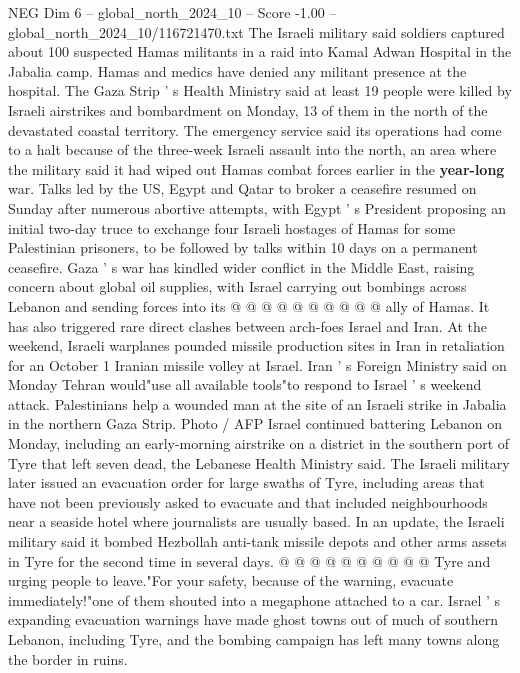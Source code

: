 \begin{textsample}{NEG Dim 6 – global\_north\_2024\_10 – Score -1.00 – global\_north\_2024\_10/116721470.txt}  \label{ex:f6_neg_080}
The Israeli military said soldiers captured about 100 suspected Hamas militants in a raid into Kamal Adwan Hospital in the Jabalia camp.
Hamas and medics have denied any militant presence at the hospital.
The Gaza Strip ' s Health Ministry said at least 19 people were killed by Israeli airstrikes and bombardment on Monday, 13 of them in the north of the devastated coastal territory.
The emergency service said its operations had come to a halt because of the three-week Israeli assault into the north, an area where the military said it had wiped out Hamas combat forces earlier in the \textbf{year-long} war.
Talks led by the US, Egypt and Qatar to broker a ceasefire resumed on Sunday after numerous abortive attempts, with Egypt ' s President proposing an initial two-day truce to exchange four Israeli hostages of Hamas for some Palestinian prisoners, to be followed by talks within 10 days on a permanent ceasefire.
Gaza ' s war has kindled wider conflict in the Middle East, raising concern about global oil supplies, with Israel carrying out bombings across Lebanon and sending forces into its @ @ @ @ @ @ @ @ @ @ ally of Hamas.
It has also triggered rare direct clashes between arch-foes Israel and Iran.
At the weekend, Israeli warplanes pounded missile production sites in Iran in retaliation for an October 1 Iranian missile volley at Israel.
Iran ' s Foreign Ministry said on Monday Tehran would"use all available tools"to respond to Israel ' s weekend attack.
Palestinians help a wounded man at the site of an Israeli strike in Jabalia in the northern Gaza Strip.
Photo / AFP Israel continued battering Lebanon on Monday, including an early-morning airstrike on a district in the southern port of Tyre that left seven dead, the Lebanese Health Ministry said.
The Israeli military later issued an evacuation order for large swaths of Tyre, including areas that have not been previously asked to evacuate and that included neighbourhoods near a seaside hotel where journalists are usually based.
In an update, the Israeli military said it bombed Hezbollah anti-tank missile depots and other arms assets in Tyre for the second time in several days. @ @ @ @ @ @ @ @ @ @ Tyre and urging people to leave."For your safety, because of the warning, evacuate immediately!"one of them shouted into a megaphone attached to a car.
Israel ' s expanding evacuation warnings have made ghost towns out of much of southern Lebanon, including Tyre, and the bombing campaign has left many towns along the border in ruins.

\end{textsample}
